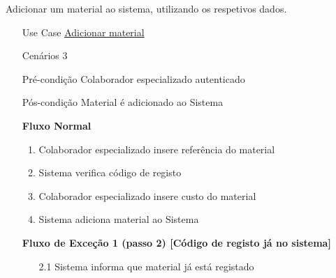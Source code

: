 \documentclass[../relatorio.tex]{subfiles}
\begin{document}
Adicionar um material ao sistema, utilizando os respetivos dados.
\begin{itemize}
    \item[Use Case] {\underline{Adicionar material}}
    \item[Cenários] {3}
    \item[Pré-condição] {Colaborador especializado autenticado}
    \item[Pós-condição] {Material é adicionado ao Sistema}
          \begin{flushleft}
              \textbf{Fluxo Normal}
          \end{flushleft}
          \begin{enumerate}
              \item Colaborador especializado insere referência do material
              \item Sistema verifica código de registo
              \item Colaborador especializado insere custo do material
              \item Sistema adiciona material ao Sistema
          \end{enumerate}
          \begin{flushleft}
              \textbf{Fluxo de Exceção 1 (passo 2) [Código de registo já no sistema]}
          \end{flushleft}
          \begin{itemize}
              \item[2.1] Sistema informa que material já está registado
          \end{itemize}
\end{itemize}
\end{document}

